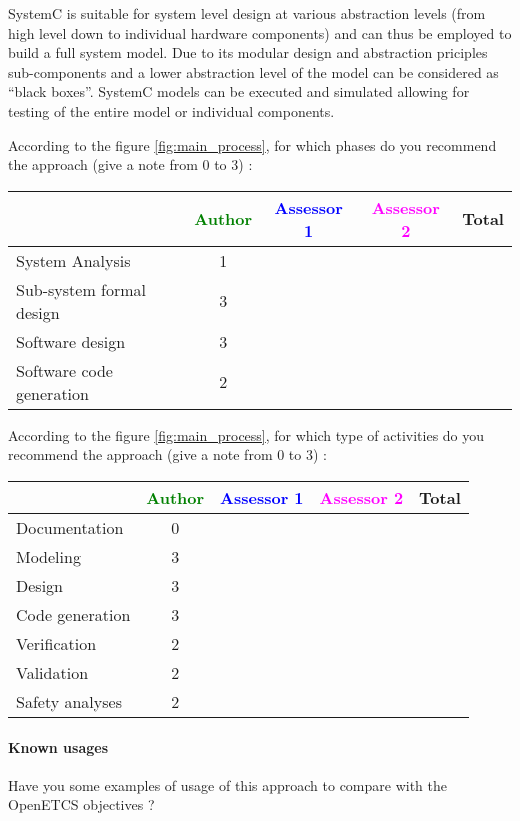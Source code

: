 SystemC is suitable for system level design at various abstraction levels (from high level down to individual hardware components) and can thus be employed to build a full system model. Due to its modular design and abstraction priciples sub-components and a lower abstraction level of the model can be considered as ``black boxes''. SystemC models can be executed and simulated allowing for testing of the entire model or individual components.

According to the figure \ref{fig:main_process}, for which phases do you recommend the approach (give a note from 0 to  3) :

\begin{tabular}{|l | c | c | c | c|}
\hline
& \textcolor{green}{Author} & \textcolor{blue}{Assessor 1} & \textcolor{magenta}{Assessor 2} & Total \\
\hline 
System Analysis &1 & & &  \\
\hline
Sub-system formal design &3 & & & \\
\hline
Software design &3 & & & \\
\hline
Software code generation &2 & & & \\
\hline
\end{tabular}

According to the figure \ref{fig:main_process}, for which type of activities do you recommend the approach (give a note from 0 to  3) :

\begin{tabular}{|l | c | c | c | c|}
\hline
& \textcolor{green}{Author} & \textcolor{blue}{Assessor 1} & \textcolor{magenta}{Assessor 2} & Total \\
\hline 
Documentation &0 & & &  \\
\hline
Modeling &3 & & &  \\
\hline
Design &3 & & & \\
\hline
Code generation &3 & & & \\
\hline
Verification &2 & & & \\
\hline
Validation &2 & & & \\
\hline
Safety analyses &2 & & & \\
\hline
\end{tabular}

\paragraph{Known usages} Have you some examples of usage of this approach to  compare with the OpenETCS objectives ?

